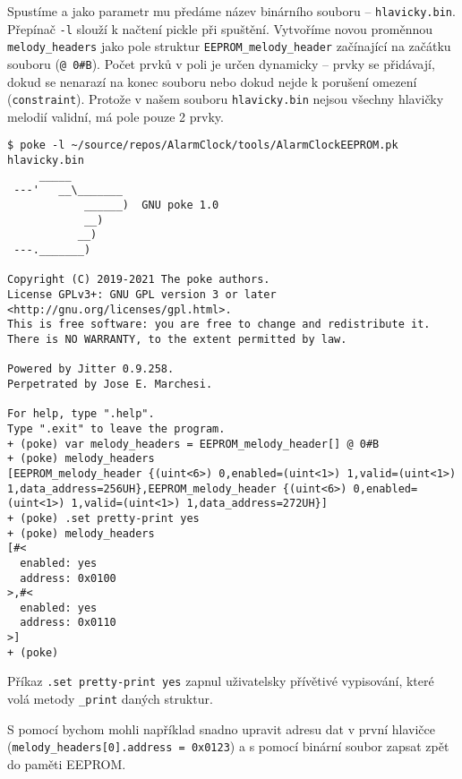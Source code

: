 Spustíme  a jako parametr mu předáme název binárního souboru --
\texttt{hlavicky.bin}. Přepínač \texttt{-l} slouží k načtení pickle při
spuštění. Vytvoříme novou proměnnou \verb|melody_headers| jako pole struktur
\verb|EEPROM_melody_header| začínající na začátku souboru (\verb|@ 0#B|). Počet
prvků v poli je určen dynamicky -- prvky se přidávají, dokud se nenarazí na
konec souboru nebo dokud nejde k porušení omezení (\texttt{constraint}).
Protože v našem souboru \texttt{hlavicky.bin} nejsou všechny hlavičky melodií
validní, má pole pouze 2 prvky.
\begin{lstlisting}[basicstyle=\ttfamily\singlespacing]
$ poke -l ~/source/repos/AlarmClock/tools/AlarmClockEEPROM.pk hlavicky.bin
     _____
 ---'   __\_______
            ______)  GNU poke 1.0
            __)
           __)
 ---._______)

Copyright (C) 2019-2021 The poke authors.
License GPLv3+: GNU GPL version 3 or later <http://gnu.org/licenses/gpl.html>.
This is free software: you are free to change and redistribute it.
There is NO WARRANTY, to the extent permitted by law.

Powered by Jitter 0.9.258.
Perpetrated by Jose E. Marchesi.

For help, type ".help".
Type ".exit" to leave the program.
+ (poke) var melody_headers = EEPROM_melody_header[] @ 0#B
+ (poke) melody_headers
[EEPROM_melody_header {(uint<6>) 0,enabled=(uint<1>) 1,valid=(uint<1>) 1,data_address=256UH},EEPROM_melody_header {(uint<6>) 0,enabled=(uint<1>) 1,valid=(uint<1>) 1,data_address=272UH}]
+ (poke) .set pretty-print yes
+ (poke) melody_headers
[#<
  enabled: yes
  address: 0x0100
>,#<
  enabled: yes
  address: 0x0110
>]
+ (poke)
\end{lstlisting}
Příkaz \verb|.set pretty-print yes| zapnul uživatelsky přívětivé vypisování,
které volá metody \verb|_print| daných struktur.

S pomocí  bychom mohli například snadno upravit adresu dat v
první hlavičce (\verb|melody_headers[0].address = 0x0123|) a s pomocí
 binární soubor zapsat zpět do paměti EEPROM.


